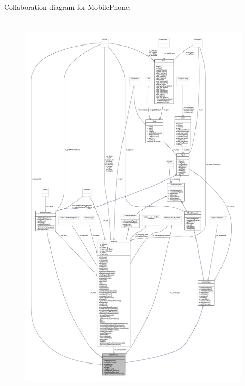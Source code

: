 Collaboration diagram for Mobile\+Phone\+:
\nopagebreak
\begin{figure}[H]
\begin{center}
\leavevmode
\includegraphics[height=550pt]{class_mobile_phone__coll__graph}
\end{center}
\end{figure}

